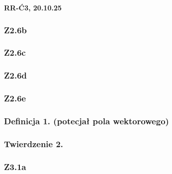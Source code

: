 \documentclass[10pt,a4paper]{article}
\newcommand{\zagadnienie}[3]{%
    \clearpage %
    \noindent\textbf{#1} #2\\
    #3
}
\begin{document}
\zagadnienie{RR-Ć3, 20.10.25}{}
{
    \subsubsection*{Z2.6b}
    \begin{quote}
    \end{quote}

    \subsubsection*{Z2.6c}
    \begin{quote}
    \end{quote}

    \subsubsection*{Z2.6d}
    \begin{quote}
    \end{quote}

    \subsubsection*{Z2.6e}
    \begin{quote}
    \end{quote}

    \begin{tcolorbox}[mybox]
    \subsubsection*{Definicja 1. (potecjał pola wektorowego)}
    \begin{quote}
    \end{quote}

    \subsubsection*{Twierdzenie 2.}
    \begin{quote}
    \end{quote}
    \end{tcolorbox}

    \subsubsection*{Z3.1a}
    \begin{quote}
    \end{quote}
        
}
\end{document}
